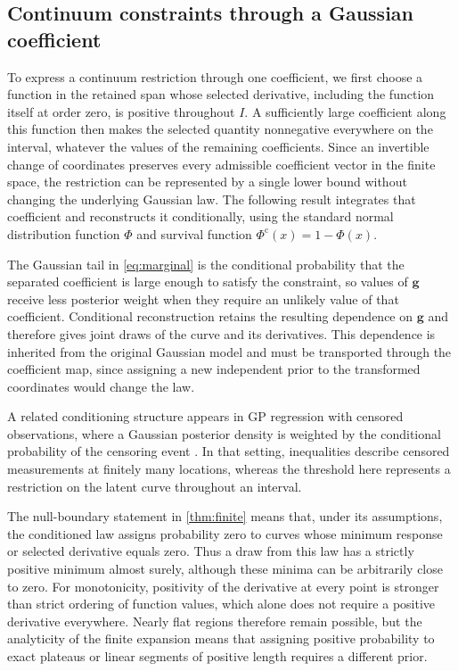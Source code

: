 \subsection{Continuum constraints through a Gaussian coefficient}\label{sec:methods}

To express a continuum restriction through one coefficient, we first
choose a function in the retained span whose selected derivative,
including the function itself at order zero, is positive throughout $I$.
A sufficiently large coefficient along this function then makes the
selected quantity nonnegative everywhere on the interval, whatever
the values of the remaining coefficients. Since an invertible change
of coordinates preserves every admissible coefficient vector in the
finite space, the restriction can be represented by a single lower
bound without changing the underlying Gaussian law. The following
result integrates that coefficient and reconstructs it conditionally,
using the standard normal distribution function $\Phi$ and survival
function $\Phi^{\mathrm c}(x)=1-\Phi(x)$.



The Gaussian tail in \cref{eq:marginal} is the conditional probability
that the separated coefficient is large enough to satisfy the
constraint, so values of $\boldsymbol g$ receive less posterior weight
when they require an unlikely value of that coefficient. Conditional
reconstruction retains the resulting dependence on $\boldsymbol g$ and
therefore gives joint draws of the curve and its derivatives. This
dependence is inherited from the original Gaussian model and must be
transported through the coefficient map, since assigning a new
independent prior to the transformed coordinates would change the law.

A related conditioning structure appears in GP regression with censored
observations, where a Gaussian posterior density is weighted by the
conditional probability of the censoring event
\citep{gormhoffmann2025censored}. In that setting, inequalities describe
censored measurements at finitely many locations, whereas the threshold
here represents a restriction on the latent curve throughout an interval.

The null-boundary statement in \cref{thm:finite} means that, under
its assumptions, the conditioned law assigns probability zero to curves
whose minimum response or selected derivative equals zero. Thus a draw
from this law has a strictly positive minimum almost surely, although
these minima can be arbitrarily close to zero. For monotonicity,
positivity of the derivative at every point is stronger than strict
ordering of function values, which alone does not require a positive
derivative everywhere. Nearly flat regions therefore remain possible,
but the analyticity of the finite expansion means that assigning
positive probability to exact plateaus or linear segments of positive
length requires a different prior.

